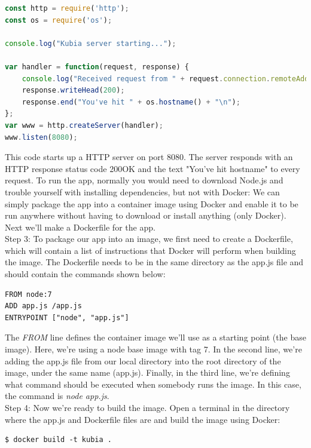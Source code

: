 \documentclass[a4paper,10pt]{article}
\begin{document}
\begin{lstlisting}[language=JavaScript, numbers=none, frame=single]
const http = require('http');
const os = require('os');

console.log("Kubia server starting...");

var handler = function(request, response) { 
	console.log("Received request from " + request.connection.remoteAddress);
	response.writeHead(200);
	response.end("You've hit " + os.hostname() + "\n");
};
var www = http.createServer(handler);
www.listen(8080);
\end{lstlisting}

This code starts up a HTTP server on port 8080. The server responds with an HTTP response status code 200OK and the text "You've hit hostname" to every request. To run the app, normally you would need to download Node.js and trouble yourself with installing dependencies, but not with Docker: We can simply package the app into a container image using Docker and enable it to be run anywhere without having to download or install anything (only Docker). Next we'll make a Dockerfile for the app. \\

Step 3: To package our app into an image, we first need to create a Dockerfile, which will contain a list of instructions  that Docker will perform when building the image. The Dockerfile needs to be in the same directory as the app.js file and should contain the commands shown below:

\begin{lstlisting}[language=Docker, numbers=none, frame=single]
FROM node:7
ADD app.js /app.js
ENTRYPOINT ["node", "app.js"]
\end{lstlisting}

The \textit{FROM} line defines the container image we'll use as a starting point (the base image). Here, we're using a node base image with tag 7. In the second line, we're adding the app.js file from our local directory into the root directory of the image, under the same name (app.js). Finally, in the third line, we're defining what command should be executed when  somebody runs the image. In this case, the command is \textit{node app.js}. \\

Step 4: Now we're ready to build the image. Open a terminal in the directory where the app.js and Dockerfile files are and build the image using Docker:

\begin{lstlisting}[numbers=none, basicstyle=\mdseries]
$ docker build -t kubia .
\end{lstlisting}
\end{document}
